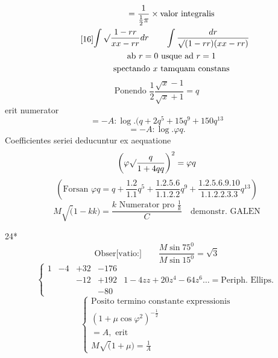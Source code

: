 \begin{equation}\tag*{[16]}\begin{gathered}
=\frac1{\frac12\pi}\times\text{valor integralis}\\
\int\surd\frac{1-rr}{xx-rr}dr\qquad\int\frac{dr}{\surd(1-rr)(xx-rr)}\\
\text{ab }r=0\text{ usque ad }r=1\\
\text{spectando }x\text{ tamquam constans}
\end{gathered}\end{equation}
\begin{equation}\tag*{[17]}\text{Ponendo }\frac12\frac{\surd x-1}{\surd x+1}=q\end{equation}
\noindent erit numerator
\begin{equation}\tag*{[18]}=-A:\log.(q+2q^5+15q^9+150q^{13}\end{equation}
\begin{equation}\tag*{[19]}=-A:\log.\varphi q.\end{equation}
\noindent Coefficientes seriei deducuntur ex aequatione
\[\left(\varphi\surd\frac{q}{1+4qq}\right)^2=\varphi q\]
{\small\[\left(\text{Forsan }\varphi q=q+\frac{1.2}{1.1}q^5+\frac{1.2.5.6}{1.1.2.2}q^9+\frac{1.2.5.6.9.10}{1.1.2.2.3.3}q^{13}\right)\]}
\begin{equation}\tag*{[20]}M\surd(1-kk)=\frac{k\text{ Numerator pro }\frac1k}{C}\quad\text{demonstr. GALEN}\end{equation}
\par\vfill\hfill24*
\clearpage
{}
\begin{equation}\tag*{[21]}\text{Obser[vatio:]}\qquad\frac{M\sin75^0}{M\sin15^0}=\surd3\end{equation}
{\small\begin{equation}\tag*{[22]}\left\{\begin{array}{rrrrl}
1&-4&+32&-176&\\
&&-12&+192&1-4zz+20z^4-64z^6\ldots=\text{Periph. Ellips.}\\
&&&-80&
\end{array}\right.\end{equation}}
\noindent [S. 12]
\begin{equation}\tag*{[24]}\left\{\begin{gathered}
\text{Posito termino constante expressionis}\\
(1+\mu\cos\varphi^2)^{-\frac12}\\
=A,\text{ erit}\\
M\surd(1+\mu)=\frac1A
\end{gathered}\right.\end{equation}
